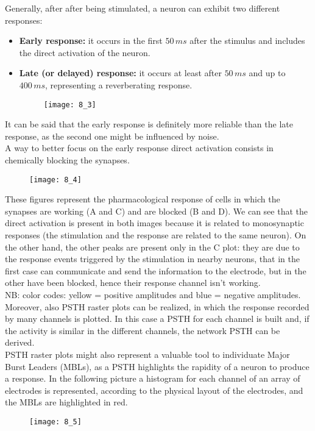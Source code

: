 Generally, after after being stimulated, a neuron can exhibit two different responses:
\begin{itemize}
    \item \textbf{Early response:} it occurs in the first \(50\,ms\) after the stimulus
          and includes the direct activation of the neuron.
    \item \textbf{Late (or delayed) response:} it occurs at least after \(50\,ms\) and up to
          \(400\,ms\), representing a reverberating response.
    \begin{figure}[H]
    \texttt{[image: 8\_3]}
    \centering
\end{figure}
\end{itemize}
It can be said that the early response is definitely more reliable than the late
response, as the second one might be influenced by noise.\\
A way to better focus on the early response direct activation consists in chemically blocking the synapses.
\begin{figure}[H]
    \texttt{[image: 8\_4]}
    \centering
\end{figure}
These figures represent the pharmacological response of cells in which the synapses are working (A and C) and are blocked (B and D). We can see that the direct activation is present in both images because it is related to monosynaptic responses (the stimulation and the response are related to the same neuron). On the other hand, the other peaks are present only in the C plot: they are due to the response events triggered by the stimulation in nearby neurons, that in the first case can communicate and send the information to the electrode, but in the other have been blocked, hence their response channel isn't working.\\
NB: color codes: yellow = positive amplitudes and blue = negative amplitudes.\\
Moreover, also PSTH raster plots can be realized, in which the response recorded by many channels is plotted. In this case a PSTH for each channel is built and, if the activity is similar in the different channels, the network PSTH can be derived.\\
PSTH raster plots might also represent a valuable tool to individuate Major Burst
Leaders (MBLs), as a PSTH highlights the rapidity of a neuron to produce a response. In the
following picture a histogram for each channel of an array of electrodes is represented,
according to the physical layout of the electrodes, and the MBLs are highlighted in red.
\begin{figure}[H]
    \texttt{[image: 8\_5]}
    \centering
\end{figure}
